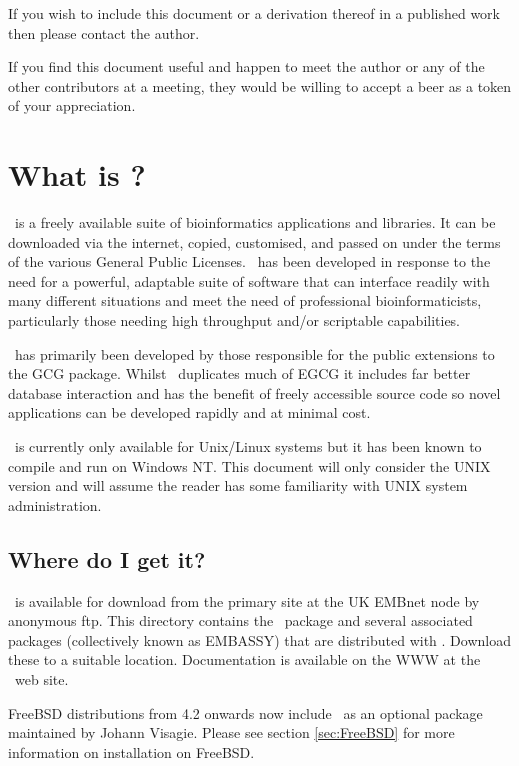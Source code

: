 \documentclass{report}
\begin{document}
If you wish to include this document or a derivation thereof in a published work then please contact the author.

If you find this document useful and happen to meet the author or any of 
the other contributors at a meeting, they would be willing to accept a beer 
as a token of your appreciation.

\section{What is \EMBOSS?}

\EMBOSS\ is a freely available suite of bioinformatics applications and libraries. It can be downloaded via the internet, copied, customised, and passed on under the terms of  the various General Public Licenses.  \EMBOSS\ has been developed in response to the need for a powerful, adaptable suite of software that can interface readily with many different situations and meet the need of professional bioinformaticists, particularly those needing high throughput and/or scriptable capabilities.

\EMBOSS\ has primarily been developed by those responsible for the public extensions to the GCG package. Whilst \EMBOSS\ duplicates much of EGCG it includes far better database interaction and has the benefit of freely accessible source code so novel applications can be developed rapidly and at minimal cost.

\EMBOSS\ is currently only available for Unix/Linux systems but it has been known to compile and run on Windows NT. This document will only consider the UNIX version and will assume the reader has some familiarity with UNIX system administration.

\subsection{Where do I get it?}

\EMBOSS\ is available for download from the primary site at the UK EMBnet node by anonymous ftp. 
This directory contains the \EMBOSS\ package and several associated packages (collectively known as EMBASSY) that are distributed with \EMBOSS. Download these to a suitable location. Documentation is available on the WWW at the \EMBOSS\ web site.

FreeBSD distributions from 4.2 onwards now include \EMBOSS\ as an optional package maintained by Johann Visagie. Please see section \ref{sec:FreeBSD} for more information on installation on FreeBSD.
\end{document}
